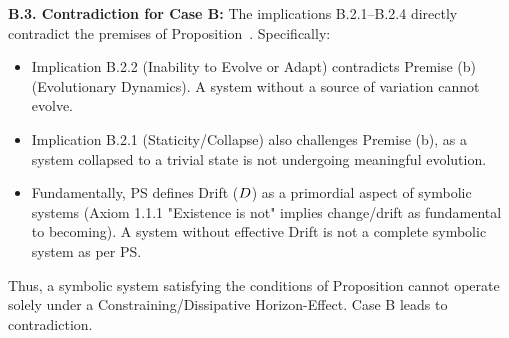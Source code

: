 \textbf{B.3. Contradiction for Case B:}  
The implications B.2.1–B.2.4 directly contradict the premises  
of Proposition~.  
Specifically:
\begin{itemize}
    \item Implication B.2.2 (Inability to Evolve or Adapt) contradicts Premise (b) (Evolutionary Dynamics). A system without a source of variation cannot evolve.
    \item Implication B.2.1 (Staticity/Collapse) also challenges Premise (b), as a system collapsed to a trivial state is not undergoing meaningful evolution.
    \item Fundamentally, PS defines Drift (\(D\)) as a primordial aspect of symbolic systems (Axiom 1.1.1 "Existence is not" implies change/drift as fundamental to becoming). A system without effective Drift is not a complete symbolic system as per PS.
\end{itemize}
Thus, a symbolic system satisfying the conditions of Proposition  cannot operate solely under a Constraining/Dissipative Horizon-Effect. Case B leads to contradiction.
